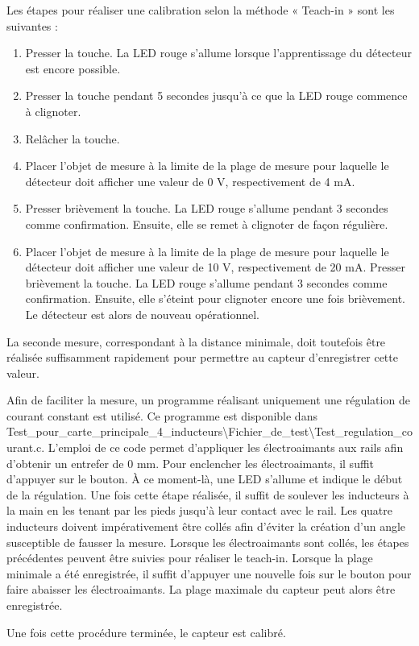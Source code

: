 Les étapes pour réaliser une calibration selon la méthode « Teach-in » sont les suivantes :

\begin{enumerate}
    \item Presser la touche. La LED rouge s’allume lorsque l’apprentissage du détecteur est encore possible.

    \item Presser la touche pendant 5 secondes jusqu’à ce que la LED rouge commence à clignoter.

    \item Relâcher la touche.

    \item Placer l’objet de mesure à la limite de la plage de mesure pour laquelle le détecteur doit afficher une valeur de 0 V, respectivement de 4 mA.

    \item Presser brièvement la touche. La LED rouge s’allume pendant 3 secondes comme confirmation. Ensuite, elle se remet à clignoter de façon régulière.

    \item Placer l’objet de mesure à la limite de la plage de mesure pour laquelle le détecteur doit afficher une valeur de 10 V, respectivement de 20 mA. Presser brièvement la touche. La LED rouge s’allume pendant 3 secondes comme confirmation. Ensuite, elle s’éteint pour clignoter encore une fois brièvement. Le détecteur est alors de nouveau opérationnel.
\end{enumerate}

La seconde mesure, correspondant à la distance minimale, doit toutefois être réalisée suffisamment rapidement pour permettre au capteur d’enregistrer cette valeur.

Afin de faciliter la mesure, un programme réalisant uniquement une régulation de courant constant est utilisé. Ce programme est disponible dans Test\_pour\_carte\_principale\_4\_inducteurs\textbackslash Fichier\_de\_test\textbackslash Test\_regulation\_courant.c. L’emploi de ce code permet d’appliquer les électroaimants aux rails afin d’obtenir un entrefer de 0 mm. Pour enclencher les électroaimants, il suffit d’appuyer sur le bouton. À ce moment-là, une LED s’allume et indique le début de la régulation. Une fois cette étape réalisée, il suffit de soulever les inducteurs à la main en les tenant par les pieds jusqu’à leur contact avec le rail. Les quatre inducteurs doivent impérativement être collés afin d’éviter la création d’un angle susceptible de fausser la mesure. Lorsque les électroaimants sont collés, les étapes précédentes peuvent être suivies pour réaliser le teach-in. Lorsque la plage minimale a été enregistrée, il suffit d’appuyer une nouvelle fois sur le bouton pour faire abaisser les électroaimants. La plage maximale du capteur peut alors être enregistrée.

Une fois cette procédure terminée, le capteur est calibré.